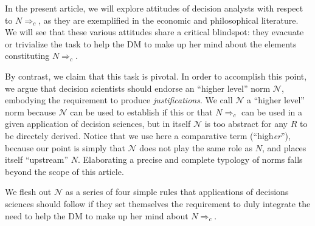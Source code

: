 \documentclass[preprint, french, english, 11pt, authoryear]{elsarticle}%
\newcommand{\adv}{\mathscr{N}}
\begin{document}
In the present article, we will explore attitudes of decision analysts with respect to $N ⇒_c$, as they are exemplified in the economic and philosophical literature. We will see that these various attitudes share a critical blindspot: they evacuate or trivialize the task to help the \ac{DM} to make up her mind about the elements constituting $N ⇒_c$.

By contrast, we claim that this task is pivotal. In order to accomplish this point, we argue that decision scientists should endorse an “higher level” norm $\adv$, embodying the requirement to produce \emph{justifications}. We call $\adv$ a “higher level” norm because $\adv$ can be used to establish if this or that $N ⇒_c$ can be used in a given application of decision sciences, but in itself $\adv$ is too abstract for any $R$ to be directely derived. Notice that we use here a comparative term (“high\emph{er}”), because our point is simply that $\adv$ does not play the same role as $N$, and places itself “upstream” $N$. Elaborating a precise and complete typology of norms falls beyond the scope of this article.

We flesh out $\adv$ as a series of four simple rules that applications of decisions sciences should follow if they set themselves the requirement to duly integrate the need to help the \ac{DM} to make up her mind about $N ⇒_c$. 
\end{document}
